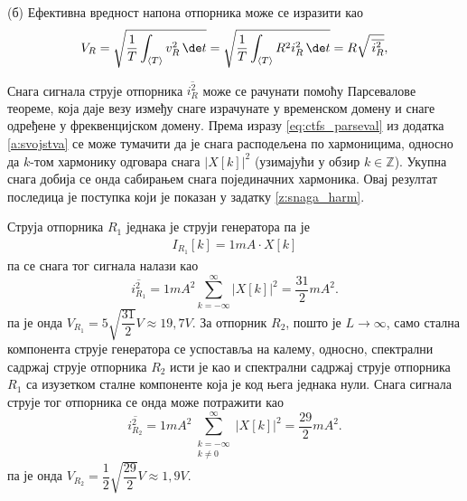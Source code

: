 (б) Ефективна вредност напона отпорника може се изразити као 
\begin{eqnarray}
    V_R = \sqrt{ \dfrac{1}{T} \int_{\langle T \rangle} v_R^2  \, \de t  }
        = \sqrt{ \dfrac{1}{T} \int_{\langle T \rangle} R^2 i_R^2  \, \de t  }
        = R \sqrt{ \, \overline{i_R^2} },
\end{eqnarray}

Снага сигнала струје отпорника $\overline{i_R^2}$ може се рачунати помоћу Парсевалове теореме, која даје везу између снаге 
израчунате у временском домену и снаге одређене у фреквенцијском домену. Према изразу \ref{eq:ctfs_parseval} из додатка 
\ref{a:svojstva} се може тумачити да је снага расподељена по хармоницима, односно да $k$-том хармонику одговара 
снага $|X[k]|^2$ (узимајући у обзир $k \in \mathbb Z$). Укупна снага добија се онда сабирањем снага појединачних хармоника. 
Овај резултат последица је поступка који је показан у задатку
\ref{z:snaga_harm}.

Струја
отпорника $R_1$ једнака је струји генератора па је 
\begin{eqnarray}
    I_{R_1}[k] = 1\unit{mA} \cdot X[k]
\end{eqnarray}
па се снага тог сигнала налази као 
\begin{equation}
    \overline{i_{R_1}^2} = 1 \unit{mA^2} \sum_{k = -\infty}^{\infty} |X[k]|^2 = \dfrac{31}{2} \unit{mA^2}.
\end{equation}
па је онда $V_{R_1} = 5 \sqrt{\dfrac{31}{2}} \unit{V} \approx 19,7 \unit{V}$. За отпорник $R_2$, пошто је $L \to \infty$, само 
стална компонента струје генератора се успоставља на калему, односно, спектрални садржај струје отпорника 
$R_2$ исти је као и спектрални садржај струје отпорника $R_1$ са изузетком сталне компоненте која је код 
њега једнака нули. Снага сигнала струје тог отпорника се онда може потражити као
\begin{equation}
    \overline{i_{R_2}^2} = 1 \unit{mA^2} \sum_{ \substack{k = -\infty\\k\neq 0}}^{\infty} |X[k]|^2 = \dfrac{29}{2} \unit{mA^2}.
\end{equation}
па је онда $V_{R_2} = \dfrac{1}{2} \sqrt{ \dfrac{29}{2} } \unit{V} \approx 1,9 \unit{V}$.